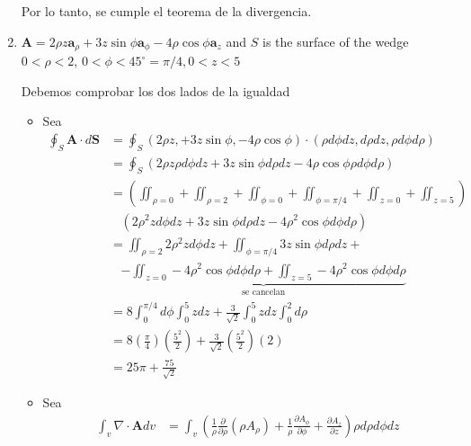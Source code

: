 \begin{problema}
\begin{enumerate}
\begin{sol}
\begin{itemize}
        \end{itemize}
        Por lo tanto, se cumple el teorema de la divergencia.
    \end{sol}
    \item $\mathbf{A}=2 \rho z \mathbf{a}_{\rho}+3 z \sin \phi \mathbf{a}_{\phi}-4 \rho \cos \phi \mathbf{a}_{z}$ and $S$ is the surface of the wedge $0<\rho<2$, $0<\phi<45^{\circ}=\pi/4, 0<z<5$
    \begin{sol}
        Debemos comprobar los dos lados de la igualdad 
        \begin{itemize}
            \item Sea
            \begin{align*}
                \oint_{S} \mathbf{A} \cdot d \mathbf{S} &=\oint_{S} \left(2 \rho z ,+3 z \sin \phi ,-4 \rho \cos \phi\right)\cdot \left(\rho d\phi dz,d\rho dz, \rho d\phi d\rho\right)\\
                &= \oint_{S} \left(2 \rho z\rho d\phi dz +3 z \sin \phi d\rho dz -4 \rho \cos \phi \rho d\phi d\rho\right)\\
                &= \left(\iint_{\rho=0}+\iint_{\rho=2}+\iint_{\phi=0}+\iint_{\phi=\pi/4}+\iint_{z=0}+\iint_{z=5}\right)\\
                & \ \ \ \ \left(2 \rho^2 z d\phi dz + 3 z \sin \phi d\rho dz -4 \rho^2 \cos \phi d\phi d\rho\right)\\
                &=\iint_{\rho=2}2 \rho^2 z d\phi dz +\iint_{\phi=\pi/4} 3 z \sin \phi d\rho dz+\\
                & \ \ \ \ \underbrace{-\iint_{z=0}-4 \rho^2 \cos \phi d\phi d\rho+\iint_{z=5}-4 \rho^2 \cos \phi d\phi d\rho}_{\text{se cancelan}}\\
                &= 8\int_{0}^{\pi/4}d\phi \int_0^5 zdz+\frac{3}{\sqrt{2}}\int_{0}^{5}zdz \int_{0}^{2}d\rho \\
                &= 8\left(\frac{\pi}{4}\right)\left(\frac{5^2}{2}\right)+\frac{3}{\sqrt{2}}\left(\frac{5^2}{2}\right)\left(2\right)\\
                &=25\pi +\frac{75}{\sqrt{2}}
            \end{align*}
            \item Sea 
            \begin{align*}
                \int_{v} \nabla \cdot \mathbf{A} d v &=\int_v \left(\frac{1}{\rho} \frac{\partial}{\partial \rho}\left(\rho A_\rho\right)+\frac{1}{\rho} \frac{\partial A_\phi}{\partial \phi}+\frac{\partial A_z}{\partial z}\right)\rho d\rho d\phi dz\\

\end{align*}
\end{itemize}
\end{sol}
\end{enumerate}
\end{problema}
